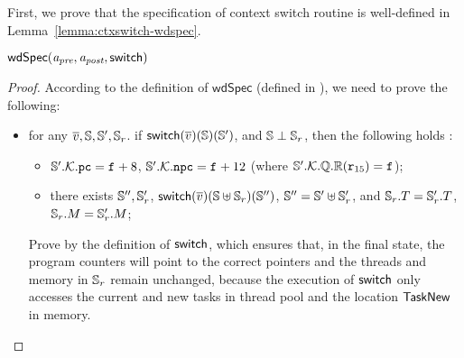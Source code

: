 {First, we prove that the specification of 
context switch routine is well-defined in 
Lemma~\ref{lemma:ctxswitch-wdspec}.
\begin{lemma}
    \em
    \label{lemma:ctxswitch-wdspec}
    $\textsf{wdSpec}({\textit{a}_\textit{pre}}, {\textit{a}_\textit{post}}, {\mathsf{switch}})$
\end{lemma}
\begin{proof}
    According to the definition of 
    $\textsf{wdSpec}$ (defined in 
    \Def{\ref{def:well-defined specification}}), 
    we need to prove the following:
    \begin{itemize}
        \item for any $\overline{v}, \mathbb{S}, \mathbb{S}', \mathbb{S}_r$. 
        if $\mathsf{switch}(\overline{v})(\mathbb{S})(\mathbb{S}')$, and 
        $\mathbb{S} \perp \mathbb{S}_r$, 
        then the following holds : 
        \begin{itemize}
            \small
            \item $\mathbb{S}'.\mathcal{K}.\texttt{pc} = \texttt{f}_{} + 8$, 
                $\mathbb{S}'.\mathcal{K}.\texttt{npc} = \texttt{f}_{} + 12$
                (where $\mathbb{S}'.\mathcal{K}.\mathbb{Q}.\mathbb{R}
                    ({\texttt{r}_{15}}) = \texttt{f}_{}$);
            \item there exists $\mathbb{S}'', \mathbb{S}_r'$, 
                $\mathsf{switch}(\overline{v})(\mathbb{S} \uplus \mathbb{S}_r) 
                    (\mathbb{S}'')$, $\mathbb{S}'' = \mathbb{S}' \uplus \mathbb{S}_r'$, 
                and $\mathbb{S}_r.T = \mathbb{S}_r'.T$, 
                $\mathbb{S}_r.M = \mathbb{S}_r'.M$; 
        \end{itemize}

        Prove by the definition of $\mathsf{switch}$, which 
        ensures that, in the final state, 
        the program counters will point to 
        the correct pointers and the threads and 
        memory in $\mathbb{S}_r$ remain unchanged, 
        because the execution of $\mathsf{switch}$ only accesses 
        the current and new tasks in thread pool 
        and the location $\mathsf{TaskNew}$ in memory.



\end{itemize}
\end{proof}}
